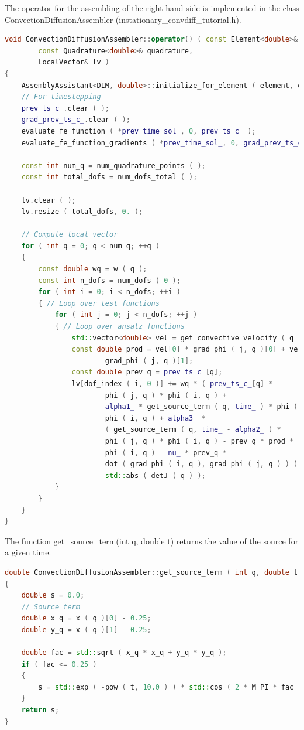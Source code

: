 \documentclass[a4paper, 11pt, twoside]{article}
\begin{document}
The operator for the assembling of the right-hand side is implemented in the class ConvectionDiffusionAssembler (instationary\_convdiff\_tutorial.h).
\begin{lstlisting}[language=C++, basicstyle={\footnotesize, \ttfamily}, keywordstyle=\color{blue}, numbers=none, tabsize=4]
void ConvectionDiffusionAssembler::operator() ( const Element<double>& element,
        const Quadrature<double>& quadrature,
        LocalVector& lv )
{
    AssemblyAssistant<DIM, double>::initialize_for_element ( element, quadrature );
    // For timestepping
    prev_ts_c_.clear ( );
    grad_prev_ts_c_.clear ( );
    evaluate_fe_function ( *prev_time_sol_, 0, prev_ts_c_ );
    evaluate_fe_function_gradients ( *prev_time_sol_, 0, grad_prev_ts_c_ );

    const int num_q = num_quadrature_points ( );
    const int total_dofs = num_dofs_total ( );

    lv.clear ( );
    lv.resize ( total_dofs, 0. );

    // Compute local vector
    for ( int q = 0; q < num_q; ++q )
    {
        const double wq = w ( q );
        const int n_dofs = num_dofs ( 0 );
        for ( int i = 0; i < n_dofs; ++i )
        { // Loop over test functions
            for ( int j = 0; j < n_dofs; ++j )
            { // Loop over ansatz functions
                std::vector<double> vel = get_convective_velocity ( q );
                const double prod = vel[0] * grad_phi ( j, q )[0] + vel[1] *
                        grad_phi ( j, q )[1];
                const double prev_q = prev_ts_c_[q];
                lv[dof_index ( i, 0 )] += wq * ( prev_ts_c_[q] *
                        phi ( j, q ) * phi ( i, q ) +
                        alpha1_ * get_source_term ( q, time_ ) * phi ( j, q ) *
                        phi ( i, q ) + alpha3_ *
                        ( get_source_term ( q, time_ - alpha2_ ) *
                        phi ( j, q ) * phi ( i, q ) - prev_q * prod *
                        phi ( i, q ) - nu_ * prev_q *
                        dot ( grad_phi ( i, q ), grad_phi ( j, q ) ) ) ) *
                        std::abs ( detJ ( q ) );
            }
        }
    }
}                                           
\end{lstlisting}

The function get\_source\_term(int q, double t) returns the value of the source for a given time.
\begin{lstlisting}[language=C++, basicstyle={\footnotesize, \ttfamily}, keywordstyle=\color{blue}, numbers=none, tabsize=4]
double ConvectionDiffusionAssembler::get_source_term ( int q, double t )
{
    double s = 0.0;
    // Source term
    double x_q = x ( q )[0] - 0.25;
    double y_q = x ( q )[1] - 0.25;

    double fac = std::sqrt ( x_q * x_q + y_q * y_q );
    if ( fac <= 0.25 )
    {
        s = std::exp ( -pow ( t, 10.0 ) ) * std::cos ( 2 * M_PI * fac );
    }
    return s;
}
\end{lstlisting}
\end{document}
